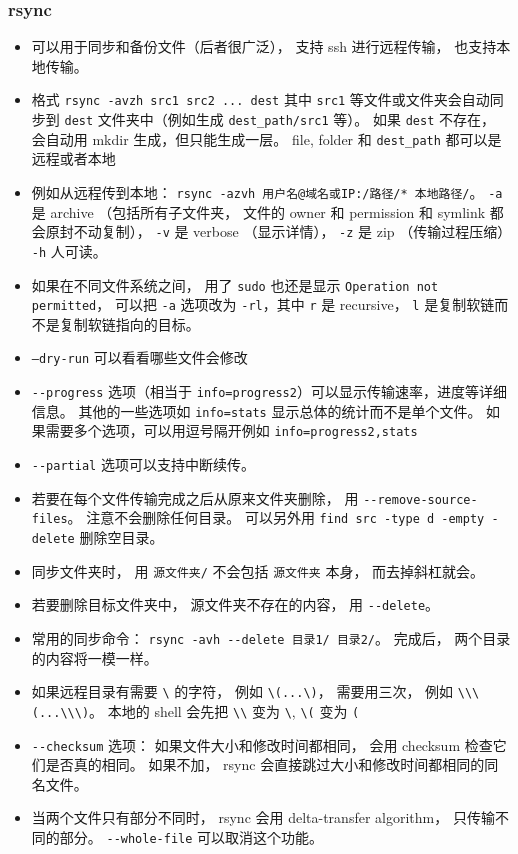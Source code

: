 \subsubsection{rsync}
\begin{itemize}
\item 可以用于同步和备份文件（后者很广泛）， 支持 ssh 进行远程传输， 也支持本地传输。
\item 格式 \verb`rsync -avzh src1 src2 ... dest` 其中 \verb|src1| 等文件或文件夹会自动同步到 \verb|dest| 文件夹中（例如生成 \verb`dest_path/src1` 等）。 如果 \verb|dest| 不存在， 会自动用 mkdir 生成，但只能生成一层。 file, folder 和 \verb|dest_path| 都可以是远程或者本地
\item 例如从远程传到本地： \verb|rsync -azvh 用户名@域名或IP:/路径/* 本地路径/|。 \verb`-a` 是 archive （包括所有子文件夹， 文件的 owner 和 permission 和 symlink 都会原封不动复制）， \verb`-v` 是 verbose （显示详情）， \verb`-z` 是 zip （传输过程压缩） \verb`-h` 人可读。
\item 如果在不同文件系统之间， 用了 \verb|sudo| 也还是显示 \verb|Operation not permitted|， 可以把 \verb|-a| 选项改为 \verb|-rl|，其中 \verb|r| 是 recursive， \verb|l| 是复制软链而不是复制软链指向的目标。
\item \verb|–dry-run| 可以看看哪些文件会修改
\item \verb|--progress| 选项（相当于 \verb|info=progress2|）可以显示传输速率，进度等详细信息。 其他的一些选项如 \verb|info=stats| 显示总体的统计而不是单个文件。 如果需要多个选项，可以用逗号隔开例如 \verb|info=progress2,stats|
\item \verb|--partial| 选项可以支持中断续传。
\item 若要在每个文件传输完成之后从原来文件夹删除， 用 \verb`--remove-source-files`。 注意不会删除任何目录。 可以另外用 \verb|find src -type d -empty -delete| 删除空目录。
\item 同步文件夹时， 用 \verb|源文件夹/| 不会包括 \verb|源文件夹| 本身， 而去掉斜杠就会。
\item 若要删除目标文件夹中， 源文件夹不存在的内容， 用 \verb`--delete`。
\item 常用的同步命令： \verb|rsync -avh --delete 目录1/ 目录2/|。 完成后， 两个目录的内容将一模一样。
\item 如果远程目录有需要 \verb`\` 的字符， 例如 \verb`\(...\)`， 需要用三次， 例如 \verb`\\\(...\\\)`。 本地的 shell 会先把 \verb`\\` 变为 \verb`\`, \verb`\(` 变为 \verb`(`
\item \verb|--checksum| 选项： 如果文件大小和修改时间都相同， 会用 checksum 检查它们是否真的相同。 如果不加， rsync 会直接跳过大小和修改时间都相同的同名文件。
\item 当两个文件只有部分不同时， rsync 会用 delta-transfer algorithm， 只传输不同的部分。 \verb|--whole-file| 可以取消这个功能。
\end{itemize}

